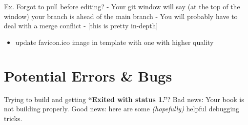 \documentclass[
]{book}
\providecommand{\tightlist}{%
  \setlength{\itemsep}{0pt}\setlength{\parskip}{0pt}}
\theoremstyle{definition}
\theoremstyle{definition}
\theoremstyle{definition}
\theoremstyle{definition}
\theoremstyle{remark}
\begin{document}
Ex. Forgot to pull before editing?
- Your git window will say (at the top of the window) your branch is ahead of the main branch
- You will probably have to deal with a merge conflict
- {[}this is pretty in-depth{]}

\begin{itemize}
\tightlist
\item
  update favicon.ico image in template with one with higher quality
\end{itemize}

\section{Potential Errors \& Bugs}\label{potential-errors-bugs}

Trying to build and getting \textbf{``Exited with status 1.''}? Bad news: Your book is not building properly. Good news: here are some \emph{(hopefully)} helpful debugging tricks.
\end{document}
